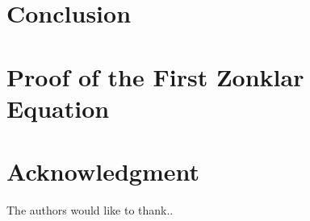 \documentclass[conference]{IEEEtran}
\begin{document}
\section{Conclusion}






%

  
\appendices
\section{Proof of the First Zonklar Equation}

\section*{Acknowledgment}


The authors would like to thank..




\newpage
\end{document}
